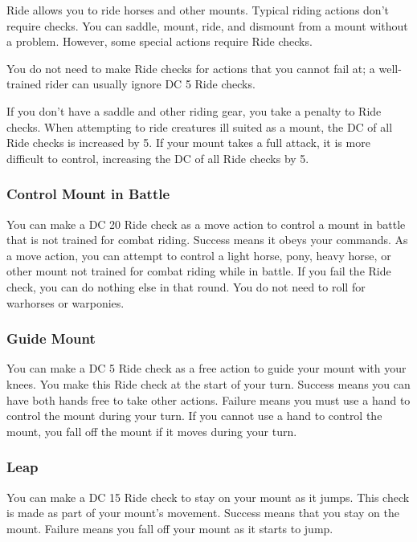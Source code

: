 Ride allows you to ride horses and other mounts. Typical riding actions don't require checks. You can saddle, mount, ride, and dismount from a mount without a problem. However, some special actions require Ride checks. 

You do not need to make Ride checks for actions that you cannot fail at; a well-trained rider can usually ignore DC 5 Ride checks.

If you don't have a saddle and other riding gear, you take a  penalty to Ride checks. When attempting to ride creatures ill suited as a mount, the DC of all Ride checks is increased by 5. If your mount takes a full attack, it is more difficult to control, increasing the DC of all Ride checks by 5. 

\subsubsection{Control Mount in Battle}
You can make a DC 20 Ride check as a move action to control a mount in battle that is not trained for combat riding. Success means it obeys your commands. 
 As a move action, you can attempt to control a light horse, pony, heavy horse, or other mount not trained for combat riding while in battle. If you fail the Ride check, you can do nothing else in that round. You do not need to roll for warhorses or warponies.

\subsubsection{Guide Mount}
You can make a DC 5 Ride check as a free action to guide your mount with your knees. You make this Ride check at the start of your turn. Success means you can have both hands free to take other actions. Failure means you must use a hand to control the mount during your turn. If you cannot use a hand to control the mount, you fall off the mount if it moves during your turn.

\subsubsection{Leap}
You can make a DC 15 Ride check to stay on your mount as it jumps. This check is made as part of your mount's movement. Success means that you stay on the mount. Failure means you fall off your mount as it starts to jump.

